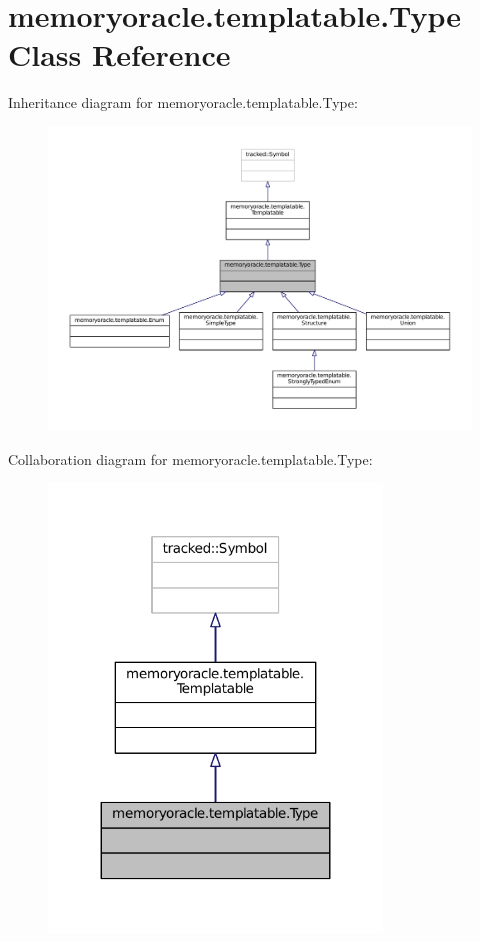 \hypertarget{classmemoryoracle_1_1templatable_1_1Type}{}\section{memoryoracle.\+templatable.\+Type Class Reference}
\label{classmemoryoracle_1_1templatable_1_1Type}


Inheritance diagram for memoryoracle.\+templatable.\+Type\+:\nopagebreak
\begin{figure}[H]
\begin{center}
\leavevmode
\includegraphics[width=350pt]{classmemoryoracle_1_1templatable_1_1Type__inherit__graph}
\end{center}
\end{figure}


Collaboration diagram for memoryoracle.\+templatable.\+Type\+:\nopagebreak
\begin{figure}[H]
\begin{center}
\leavevmode
\includegraphics[width=251pt]{classmemoryoracle_1_1templatable_1_1Type__coll__graph}
\end{center}
\end{figure}


